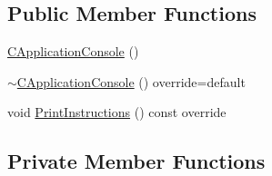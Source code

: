 \subsection*{Public Member Functions}
\begin{DoxyCompactItemize}
\item 
\hyperlink{classCApplicationConsole_a5d2e88210a41c621fbfb933eedb181b1}{C\+Application\+Console} ()
\item 
\hyperlink{classCApplicationConsole_ab06aed70666ce71431eb314dfcadb35e}{$\sim$\+C\+Application\+Console} () override=default
\item 
void \hyperlink{classCApplicationConsole_a77c169050d8faff5ff4019d3204e6ff8}{Print\+Instructions} () const override
\end{DoxyCompactItemize}
\subsection*{Private Member Functions}
